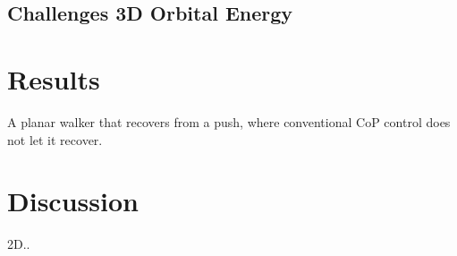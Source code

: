 \subsection{Challenges 3D Orbital Energy}

\section{Results}
A planar walker that recovers from a push, where conventional \ac{CoP} control does not let it recover.

\section{Discussion}
2D..
